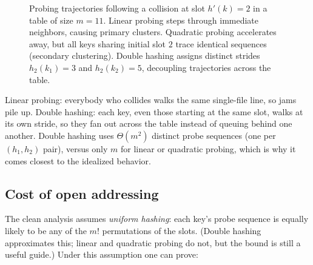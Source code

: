\begin{figure}[h]
\caption{Probing trajectories following a collision at slot $h'(k)=2$ in a table of size $m=11$. Linear probing steps through immediate neighbors, causing primary clusters. Quadratic probing accelerates away, but all keys sharing initial slot $2$ trace identical sequences (secondary clustering). Double hashing assigns distinct strides $h_2(k_1)=3$ and $h_2(k_2)=5$, decoupling trajectories across the table.}
\label{ch11:probing-trajectories}
\end{figure}

\begin{intuitionbox}
Linear probing: everybody who collides walks the same single-file line, so jams pile up. Double hashing: each key, even those starting at the same slot, walks at its own stride, so they fan out across the table instead of queuing behind one another. Double hashing uses $\Theta(m^2)$ distinct probe sequences (one per $(h_1,h_2)$ pair), versus only $m$ for linear or quadratic probing, which is why it comes closest to the idealized behavior.
\end{intuitionbox}

\subsection{Cost of open addressing}

The clean analysis assumes \emph{uniform hashing}: each key's probe sequence is equally likely to be any of the $m!$ permutations of the slots. (Double hashing approximates this; linear and quadratic probing do not, but the bound is still a useful guide.) Under this assumption one can prove:

